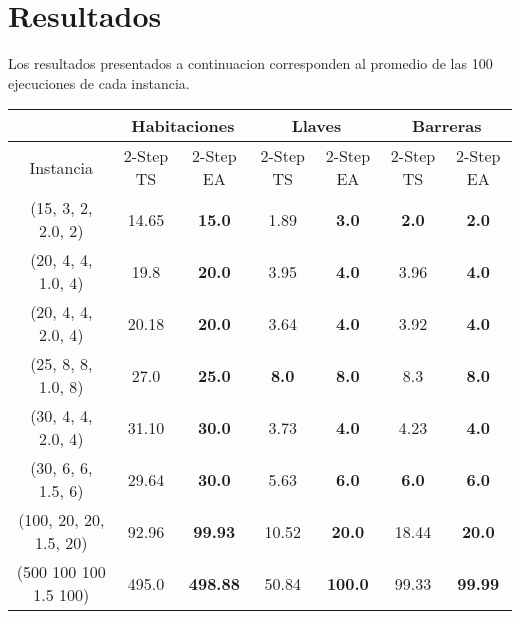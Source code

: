 \documentclass[letter, 10pt]{article}
\begin{document}
\section{Resultados}
Los resultados presentados a continuacion corresponden al promedio de las 100 ejecuciones de cada instancia.
\newline
\begin{center}
\begin{tabular}{|c|c|c|c|c|c|c|}
\hline
 & \multicolumn{2}{|c|}{Habitaciones} & \multicolumn{2}{|c|}{Llaves} & \multicolumn{2}{|c|}{Barreras} \\
\hline
Instancia & 2-Step TS & 2-Step EA & 2-Step TS & 2-Step EA & 2-Step TS & 2-Step EA \\
\hline
(15, 3, 2, 2.0, 2) & 14.65 & \textbf{15.0} & 1.89 & \textbf{3.0} & \textbf{2.0} & \textbf{2.0} \\
(20, 4, 4, 1.0, 4) & 19.8 & \textbf{20.0} & 3.95 & \textbf{4.0} & 3.96 & \textbf{4.0}\\
(20, 4, 4, 2.0, 4) & 20.18 & \textbf{20.0} & 3.64 & \textbf{4.0} & 3.92 & \textbf{4.0} \\
(25, 8, 8, 1.0, 8) & 27.0 & \textbf{25.0} & \textbf{8.0} & \textbf{8.0} & 8.3 & \textbf{8.0} \\
(30, 4, 4, 2.0, 4) & 31.10 & \textbf{30.0} & 3.73 & \textbf{4.0} & 4.23 & \textbf{4.0} \\
(30, 6, 6, 1.5, 6) & 29.64 & \textbf{30.0} & 5.63 & \textbf{6.0} & \textbf{6.0} & \textbf{6.0} \\
(100, 20, 20, 1.5, 20) & 92.96 & \textbf{99.93} & 10.52 & \textbf{20.0} & 18.44 & \textbf{20.0} \\
(500 100 100 1.5 100) & 495.0 & \textbf{498.88} & 50.84 & \textbf{100.0} & 99.33 & \textbf{99.99}\\
\hline
\end{tabular}



\end{center}
\end{document}
